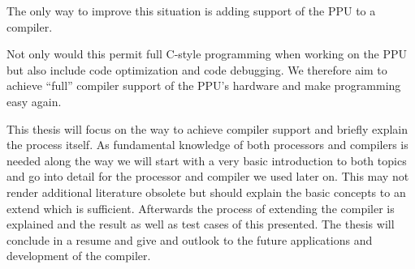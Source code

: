 The only way to improve this situation is adding support of the PPU to a compiler.

Not only would this permit full C-style programming when working on the PPU but also include code optimization and code debugging.
We therefore aim to achieve ``full'' compiler support of the PPU's hardware and make programming easy again. 

This thesis will focus on the way to achieve compiler support and briefly explain the process itself.
As fundamental knowledge of both processors and compilers is needed along the way we will start with a very basic introduction to both topics and go into detail for the processor and compiler we used later on.
This may not render additional literature obsolete but should explain the basic concepts to an extend which is sufficient.
Afterwards the process of extending the compiler is explained and the result as well as test cases of this presented.
The thesis will conclude in a resume and give and outlook to the future applications and development of the compiler.

